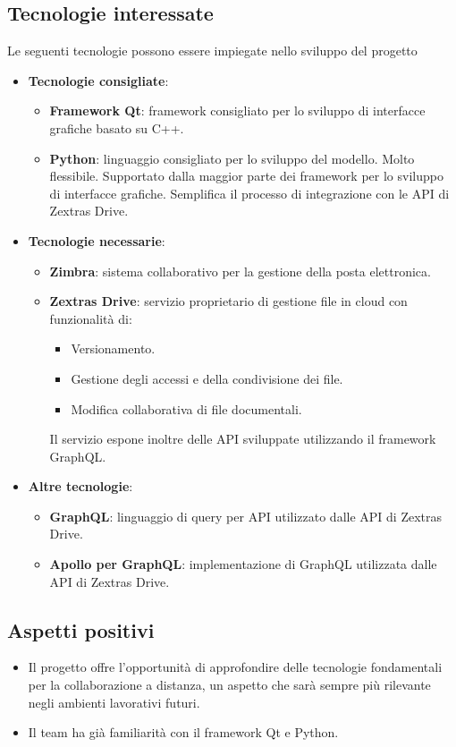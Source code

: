\subsection{Tecnologie interessate}
Le seguenti tecnologie possono essere impiegate nello sviluppo del progetto
\begin{itemize}
\item \textbf{Tecnologie consigliate}:
\begin{itemize}
	\item \textbf{Framework Qt}: framework consigliato per lo sviluppo di interfacce grafiche basato su C++.
	\item \textbf{Python}: linguaggio consigliato per lo sviluppo del modello. Molto flessibile. Supportato dalla maggior parte dei framework per lo sviluppo di interfacce grafiche. 
	Semplifica il processo di integrazione con le API di Zextras Drive.
	\end{itemize}
\item \textbf{Tecnologie necessarie}:
	\begin{itemize}
	\item \textbf{Zimbra}: sistema collaborativo per la gestione della posta elettronica.
	\item \textbf{Zextras Drive}: servizio proprietario di gestione file in cloud con funzionalità di:
		\begin{itemize}
		\item Versionamento.
		\item Gestione degli accessi e della condivisione dei file.
		\item Modifica collaborativa di file documentali.
		\end{itemize}
	Il servizio espone inoltre delle API sviluppate utilizzando il framework GraphQL.
\end{itemize}
\item \textbf{Altre tecnologie}:
	\begin{itemize}
	\item \textbf{GraphQL}: linguaggio di query per API utilizzato dalle API di Zextras Drive.	
	\item \textbf{Apollo per GraphQL}: implementazione di GraphQL utilizzata dalle API di Zextras Drive.
	\end{itemize}
\end{itemize}

\subsection{Aspetti positivi}
\begin{itemize}
\item Il progetto offre l'opportunità di approfondire delle tecnologie fondamentali per la collaborazione a distanza, un aspetto che sarà sempre più rilevante negli ambienti lavorativi futuri.
\item Il team ha già familiarità con il framework Qt e Python.
\end{itemize}

